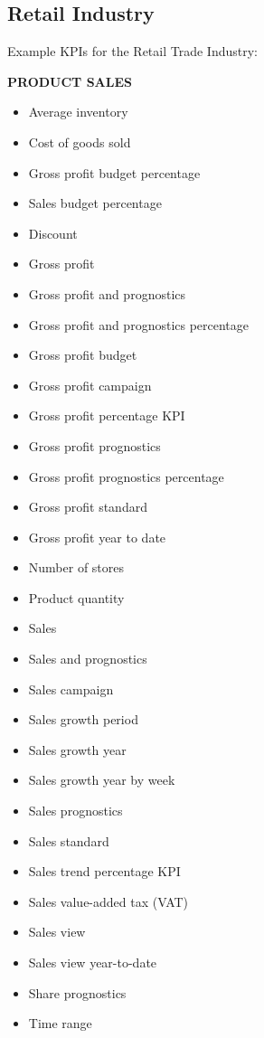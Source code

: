 \documentclass[]{book}
\providecommand{\tightlist}{%
  \setlength{\itemsep}{0pt}\setlength{\parskip}{0pt}}
\begin{document}
\subsection{Retail Industry}\label{retail-industry}

Example KPIs for the Retail Trade Industry:

\textbf{PRODUCT SALES }

\begin{itemize}
\tightlist
\item
  Average inventory
\item
  Cost of goods sold
\item
  Gross profit budget percentage
\item
  Sales budget percentage
\item
  Discount
\item
  Gross profit
\item
  Gross profit and prognostics
\item
  Gross profit and prognostics percentage
\item
  Gross profit budget
\item
  Gross profit campaign
\item
  Gross profit percentage KPI
\item
  Gross profit prognostics
\item
  Gross profit prognostics percentage
\item
  Gross profit standard
\item
  Gross profit year to date
\item
  Number of stores
\item
  Product quantity
\item
  Sales
\item
  Sales and prognostics
\item
  Sales campaign
\item
  Sales growth period
\item
  Sales growth year
\item
  Sales growth year by week
\item
  Sales prognostics
\item
  Sales standard
\item
  Sales trend percentage KPI
\item
  Sales value-added tax (VAT)
\item
  Sales view
\item
  Sales view year-to-date
\item
  Share prognostics
\item
  Time range
\end{itemize}
\end{document}
